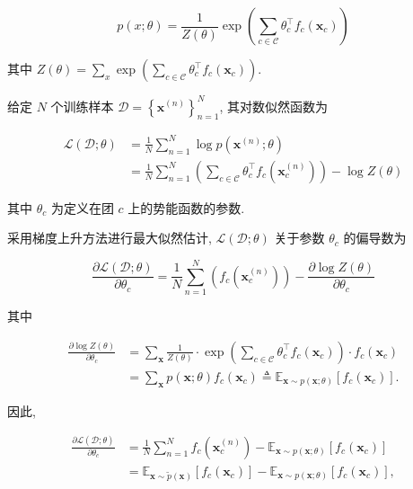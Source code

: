 \documentclass[10pt]{article}
\begin{document}
\begin{equation*}
p(x ; \theta)=\frac{1}{Z(\theta)} \exp \left(\sum_{c \in \mathcal{C}} \theta_{c}^{\top} f_{c}\left(\boldsymbol{x}_{c}\right)\right) \tag{11.30}
\end{equation*}


其中 $Z(\theta)=\sum_{x} \exp \left(\sum_{c \in \mathcal{C}} \theta_{c}^{\top} f_{c}\left(\boldsymbol{x}_{c}\right)\right)$.

给定 $N$ 个训练样本 $\mathcal{D}=\left\{\boldsymbol{x}^{(n)}\right\}_{n=1}^{N}$, 其对数似然函数为


\begin{align*}
\mathcal{L}(\mathcal{D} ; \theta) & =\frac{1}{N} \sum_{n=1}^{N} \log p\left(\boldsymbol{x}^{(n)} ; \theta\right)  \tag{11.31}\\
& =\frac{1}{N} \sum_{n=1}^{N}\left(\sum_{c \in \mathcal{C}} \theta_{c}^{\top} f_{c}\left(\boldsymbol{x}_{c}^{(n)}\right)\right)-\log Z(\theta) \tag{11.32}
\end{align*}


其中 $\theta_{c}$ 为定义在团 $c$ 上的势能函数的参数.

采用梯度上升方法进行最大似然估计, $\mathcal{L}(\mathcal{D} ; \theta)$ 关于参数 $\theta_{c}$ 的偏导数为


\begin{equation*}
\frac{\partial \mathcal{L}(\mathcal{D} ; \theta)}{\partial \theta_{c}}=\frac{1}{N} \sum_{n=1}^{N}\left(f_{c}\left(\boldsymbol{x}_{c}^{(n)}\right)\right)-\frac{\partial \log Z(\theta)}{\partial \theta_{c}} \tag{11.33}
\end{equation*}


其中


\begin{align*}
\frac{\partial \log Z(\theta)}{\partial \theta_{c}} & =\sum_{\boldsymbol{x}} \frac{1}{Z(\theta)} \cdot \exp \left(\sum_{c \in \mathcal{C}} \theta_{c}^{\top} f_{c}\left(\boldsymbol{x}_{c}\right)\right) \cdot f_{c}\left(\boldsymbol{x}_{c}\right)  \tag{11.34}\\
& =\sum_{\boldsymbol{x}} p(\boldsymbol{x} ; \theta) f_{c}\left(\boldsymbol{x}_{c}\right) \triangleq \mathbb{E}_{\boldsymbol{x} \sim p(\boldsymbol{x} ; \theta)}\left[f_{c}\left(\boldsymbol{x}_{c}\right)\right] . \tag{11.35}
\end{align*}


因此,


\begin{align*}
\frac{\partial \mathcal{L}(\mathcal{D} ; \theta)}{\partial \theta_{c}} & =\frac{1}{N} \sum_{n=1}^{N} f_{c}\left(\boldsymbol{x}_{c}^{(n)}\right)-\mathbb{E}_{\boldsymbol{x} \sim p(\boldsymbol{x} ; \theta)}\left[f_{c}\left(\boldsymbol{x}_{c}\right)\right]  \tag{11.36}\\
& =\mathbb{E}_{\boldsymbol{x} \sim \tilde{p}(\boldsymbol{x})}\left[f_{c}\left(\boldsymbol{x}_{c}\right)\right]-\mathbb{E}_{\boldsymbol{x} \sim p(\boldsymbol{x} ; \theta)}\left[f_{c}\left(\boldsymbol{x}_{c}\right)\right], \tag{11.37}
\end{align*}
\end{document}
